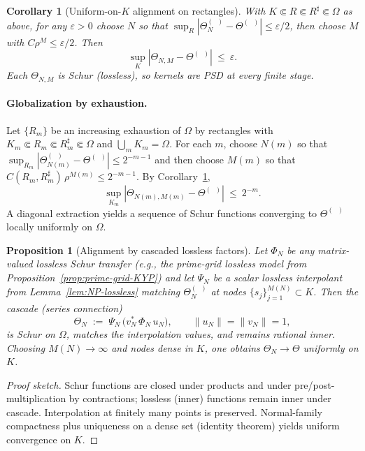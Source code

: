 \documentclass[11pt]{article}
\newtheorem{proposition}[theorem]{Proposition}
\newtheorem{corollary}[theorem]{Corollary}
\theoremstyle{remark}
\DeclareMathOperator{\dettwo}{det_2}
\begin{document}
\begin{corollary}[Uniform-on-$K$ alignment on rectangles]\label{cor:interior-alignment}
With $K\Subset R\Subset R^\sharp\Subset\Omega$ as above, for any $\varepsilon>0$ choose $N$ so that $\sup_R|\Theta_N^{(\dettwo)}-\Theta^{(\dettwo)}|\le \varepsilon/2$, then choose $M$ with $C\rho^M\le \varepsilon/2$. Then
\[
 \sup_{K}|\Theta_{N,M}-\Theta^{(\dettwo)}|\ \le\ \varepsilon.
\]
Each $\Theta_{N,M}$ is Schur (lossless), so kernels are PSD at every finite stage.
\end{corollary}

\paragraph{Globalization by exhaustion.}
Let $\{R_m\}$ be an increasing exhaustion of $\Omega$ by rectangles with $K_m\Subset R_m\Subset R_m^\sharp\Subset\Omega$ and $\bigcup_m K_m=\Omega$. For each $m$, choose $N(m)$ so that $\sup_{R_m}|\Theta_{N(m)}^{(\dettwo)}-\Theta^{(\dettwo)}|\le 2^{-m-1}$ and then choose $M(m)$ so that $C(R_m,R_m^\sharp)\,\rho^{M(m)}\le 2^{-m-1}$. By Corollary~\ref{cor:interior-alignment},
\[
 \sup_{K_m}|\Theta_{N(m),M(m)}-\Theta^{(\dettwo)}|\ \le\ 2^{-m}.
\]
A diagonal extraction yields a sequence of Schur functions converging to $\Theta^{(\dettwo)}$ locally uniformly on $\Omega$.
\begin{proposition}[Alignment by cascaded lossless factors]\label{prop:cascade}
Let \(\Phi_N\) be any matrix-valued lossless Schur transfer (e.g., the prime-grid lossless model from Proposition~\ref{prop:prime-grid-KYP}) and let \(\Psi_N\) be a scalar lossless interpolant from Lemma~\ref{lem:NP-lossless} matching \(\Theta_N^{(\dettwo)}\) at nodes \(\{s_j\}_{j=1}^{M(N)}\subset K\). Then the cascade (series connection)
\[
 \Theta_N\;:=\;\Psi_N\,\big(v_N^*\,\Phi_N\,u_N\big),\qquad \|u_N\|=\|v_N\|=1,
\]
is Schur on \(\Omega\), matches the interpolation values, and remains rational inner. Choosing \(M(N)\to\infty\) and nodes dense in \(K\), one obtains \(\Theta_N\to \Theta\) uniformly on \(K\).
\end{proposition}
\begin{proof}[Proof sketch]
Schur functions are closed under products and under pre/post-multiplication by contractions; lossless (inner) functions remain inner under cascade. Interpolation at finitely many points is preserved. Normal-family compactness plus uniqueness on a dense set (identity theorem) yields uniform convergence on \(K\).
\end{proof}
\end{document}
